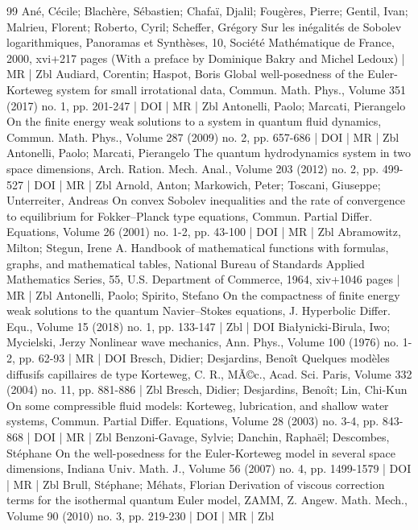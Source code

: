 \begin{thebibliography}{99}
Ané, Cécile; Blachère, Sébastien; Chafaï, Djalil; Fougères, Pierre; Gentil, Ivan; Malrieu, Florent; Roberto, Cyril; Scheffer, Grégory Sur les inégalités de Sobolev logarithmiques, Panoramas et Synthèses, 10, Société Mathématique de France, 2000, xvi+217 pages (With a preface by Dominique Bakry and Michel Ledoux) | MR | Zbl
Audiard, Corentin; Haspot, Boris Global well-posedness of the Euler-Korteweg system for small irrotational data, Commun. Math. Phys., Volume 351 (2017) no. 1, pp. 201-247 | DOI | MR | Zbl
Antonelli, Paolo; Marcati, Pierangelo On the finite energy weak solutions to a system in quantum fluid dynamics, Commun. Math. Phys., Volume 287 (2009) no. 2, pp. 657-686 | DOI | MR | Zbl
Antonelli, Paolo; Marcati, Pierangelo The quantum hydrodynamics system in two space dimensions, Arch. Ration. Mech. Anal., Volume 203 (2012) no. 2, pp. 499-527 | DOI | MR | Zbl
Arnold, Anton; Markowich, Peter; Toscani, Giuseppe; Unterreiter, Andreas On convex Sobolev inequalities and the rate of convergence to equilibrium for Fokker–Planck type equations, Commun. Partial Differ. Equations, Volume 26 (2001) no. 1-2, pp. 43-100 | DOI | MR | Zbl
Abramowitz, Milton; Stegun, Irene A. Handbook of mathematical functions with formulas, graphs, and mathematical tables, National Bureau of Standards Applied Mathematics Series, 55, U.S. Department of Commerce, 1964, xiv+1046 pages | MR | Zbl
Antonelli, Paolo; Spirito, Stefano On the compactness of finite energy weak solutions to the quantum Navier–Stokes equations, J. Hyperbolic Differ. Equ., Volume 15 (2018) no. 1, pp. 133-147 | Zbl | DOI
Białynicki-Birula, Iwo; Mycielski, Jerzy Nonlinear wave mechanics, Ann. Phys., Volume 100 (1976) no. 1-2, pp. 62-93 | MR | DOI
Bresch, Didier; Desjardins, Benoît Quelques modèles diffusifs capillaires de type Korteweg, C. R., MÃ©c., Acad. Sci. Paris, Volume 332 (2004) no. 11, pp. 881-886 | Zbl
Bresch, Didier; Desjardins, Benoît; Lin, Chi-Kun On some compressible fluid models: Korteweg, lubrication, and shallow water systems, Commun. Partial Differ. Equations, Volume 28 (2003) no. 3-4, pp. 843-868 | DOI | MR | Zbl
Benzoni-Gavage, Sylvie; Danchin, Raphaël; Descombes, Stéphane On the well-posedness for the Euler-Korteweg model in several space dimensions, Indiana Univ. Math. J., Volume 56 (2007) no. 4, pp. 1499-1579 | DOI | MR | Zbl
Brull, Stéphane; Méhats, Florian Derivation of viscous correction terms for the isothermal quantum Euler model, ZAMM, Z. Angew. Math. Mech., Volume 90 (2010) no. 3, pp. 219-230 | DOI | MR | Zbl

\end{thebibliography}
